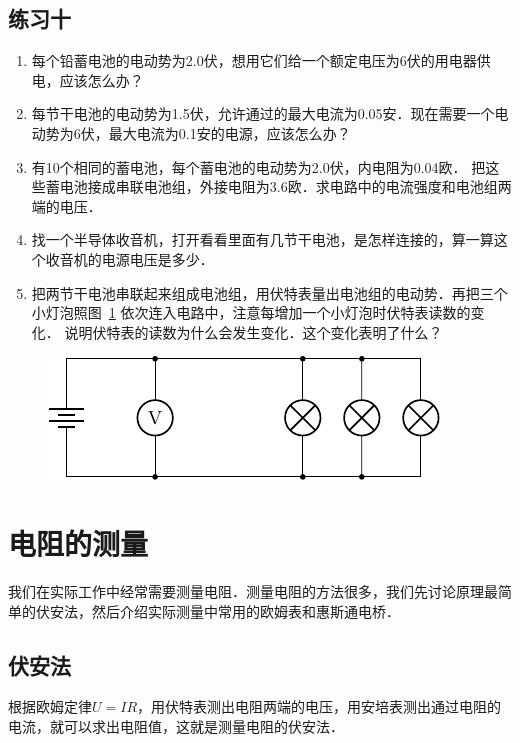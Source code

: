\subsection*{练习十}
\begin{enumerate}
    \item 每个铅蓄电池的电动势为2.0伏，想用它们给一个额定电压为6伏的用电器供电，应该怎么办？
    \item 每节干电池的电动势为1.5伏，允许通过的最大电流为0.05安．现在需要一个电动势为6伏，最大电流为0.1安的电源，应该怎么办？
    \item 有10个相同的蓄电池，每个蓄电池的电动势为2.0伏，内电阻为0.04欧．
    把这些蓄电池接成串联电池组，外接电阻为3.6欧．求电路中的电流强度和电池组两端的电压．
    \item 找一个半导体收音机，打开看看里面有几节干电池，是怎样连接的，算一算这个收音机的电源电压是多少．
    \item 把两节干电池串联起来组成电池组，用伏特表量出电池组的电动势．再把三个小灯泡照图~\ref{fig_B_7-36} 依次连入电路中，注意每增加一个小灯泡时伏特表读数的变化．
    说明伏特表的读数为什么会发生变化．这个变化表明了什么？
\end{enumerate}

\begin{figure}[htbp]
    \centering
    \includegraphics{fig/B/7-36.pdf}
    \caption{}\label{fig_B_7-36}
\end{figure}


\section{电阻的测量}
我们在实际工作中经常需要测量电阻．测量电阻的方法很多，我们先讨论原理最简单的伏安法，然后介绍实际测量中常用的欧姆表和惠斯通电桥．

\subsection{伏安法}

根据欧姆定律$U=IR$，用伏特表测出电阻两端的电压，用安培表测出通过电阻的电流，就可以求出电阻值，这就是测量电阻的伏安法．


